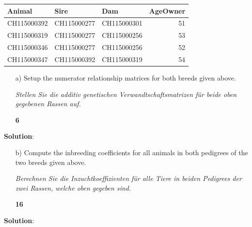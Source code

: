 \documentclass[
]{article}
\newcommand{\points}[1]
{\begin{flushright}\textbf{#1}\end{flushright}}
\newcommand{\solstart}
{\vspace{3ex}\textbf{Solution}:}
\begin{document}
\begin{longtable}[]{@{}lllr@{}}
\toprule()
Animal & Sire & Dam & AgeOwner \\
\midrule()
\endhead
CH115000392 & CH115000277 & CH115000301 & 51 \\
CH115000319 & CH115000277 & CH115000256 & 53 \\
CH115000346 & CH115000277 & CH115000256 & 52 \\
CH115000347 & CH115000392 & CH115000319 & 54 \\
\bottomrule()
\end{longtable}

\clearpage
\pagebreak

\begin{enumerate}
\item[a)] Setup the numerator relationship matrices for both breeds given above. 

\textit{Stellen Sie die additiv genetischen Verwandtschaftsmatrizen für beide oben gegebenen Rassen auf.}
\points{6}
\end{enumerate}

\vspace{3ex}
\solstart

\clearpage
\pagebreak

\begin{enumerate}
\item[b)] Compute the inbreeding coefficients for all animals in both pedigrees of the two breeds given above. 

\textit{Berechnen Sie die Inzuchtkoeffizienten für alle Tiere in beiden Pedigrees der zwei Rassen, welche oben gegeben sind.}
\points{16}
\end{enumerate}

\vspace{3ex}
\solstart

\clearpage
\pagebreak
\end{document}
